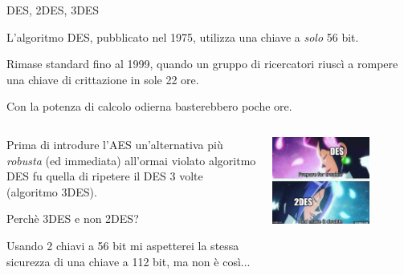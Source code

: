 \documentclass[handout, xcolor=dvipsnames,aspectratio=169]{beamer}
\begin{document}
\begin{frame}{DES, 2DES, 3DES}

  L'algoritmo DES, pubblicato nel 1975, utilizza una chiave a \textit{solo} 56 bit. 
  
  Rimase standard fino al 1999, quando un gruppo di ricercatori riuscì a rompere una chiave di crittazione in sole 22 ore.
  
  Con la potenza di calcolo odierna basterebbero poche ore.

\begin{columns}
\begin{column}{0.5\textwidth}
  \medskip

  Prima di introdure l'AES un'alternativa più \textit{robusta} (ed immediata) all'ormai violato algoritmo DES fu quella di ripetere il DES 3 volte (algoritmo 3DES).

  \medskip
  
  Perchè 3DES e non 2DES?
  
  \medskip
  
  Usando 2 chiavi a 56 bit mi aspetterei la stessa sicurezza di una chiave a 112 bit, ma non è così...
\end{column}
\begin{column}{0.5\textwidth}  %
    \begin{center}
     \includegraphics[width=0.7\textwidth]{img/2des}
     \end{center}
\end{column}
\end{columns}


\end{frame}
\end{document}
